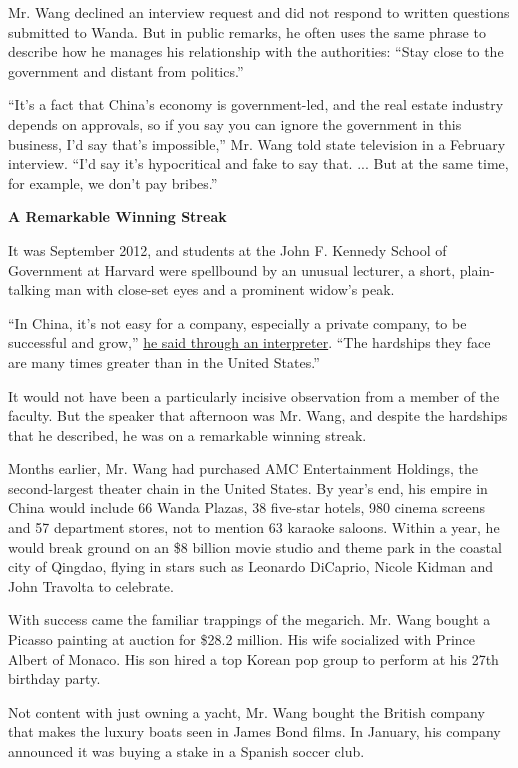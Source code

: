 Mr. Wang declined an interview request and did not respond to written
questions submitted to Wanda. But in public remarks, he often uses the
same phrase to describe how he manages his relationship with the
authorities: ``Stay close to the government and distant from politics.''

``It's a fact that China's economy is government-led, and the real
estate industry depends on approvals, so if you say you can ignore the
government in this business, I'd say that's impossible,'' Mr. Wang told
state television in a February interview. ``I'd say it's hypocritical
and fake to say that. ... But at the same time, for example, we don't
pay bribes.''

\textbf{A Remarkable Winning Streak}

It was September 2012, and students at the John F. Kennedy School of
Government at Harvard were spellbound by an unusual lecturer, a short,
plain-talking man with close-set eyes and a prominent widow's peak.

``In China, it's not easy for a company, especially a private company,
to be successful and grow,''
\href{http://www.wanda.cn/2013/chairman_0724/28.html}{he said through an
interpreter}. ``The hardships they face are many times greater than in
the United States.''

It would not have been a particularly incisive observation from a member
of the faculty. But the speaker that afternoon was Mr. Wang, and despite
the hardships that he described, he was on a remarkable winning streak.

Months earlier, Mr. Wang had purchased AMC Entertainment Holdings, the
second-largest theater chain in the United States. By year's end, his
empire in China would include 66 Wanda Plazas, 38 five-star hotels, 980
cinema screens and 57 department stores, not to mention 63 karaoke
saloons. Within a year, he would break ground on an \$8 billion movie
studio and theme park in the coastal city of Qingdao, flying in stars
such as Leonardo DiCaprio, Nicole Kidman and John Travolta to celebrate.

With success came the familiar trappings of the megarich. Mr. Wang
bought a Picasso painting at auction for \$28.2 million. His wife
socialized with Prince Albert of Monaco. His son hired a top Korean pop
group to perform at his 27th birthday party.

Not content with just owning a yacht, Mr. Wang bought the British
company that makes the luxury boats seen in James Bond films. In
January, his company announced it was buying a stake in a Spanish soccer
club.

